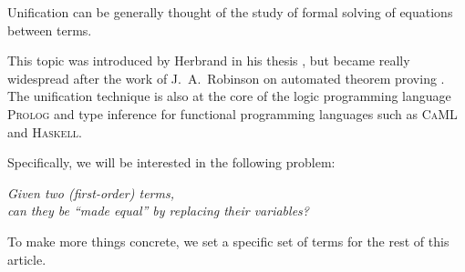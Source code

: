 Unification can be generally thought of the study of formal solving of equations between terms.

This topic was introduced by Herbrand in his thesis \cite{herbrand_recherches_1930}, but became really widespread after the work of J.~A.~Robinson on automated theorem proving \cite{robinson_machine-oriented_1965}. The unification technique is also at the core of the logic programming language \textsc{Prolog} and type inference for functional programming languages such as \textsc{CaML} and \textsc{Haskell}.


Specifically, we will be interested in the following problem: 
\begin{center}
	\it Given two (first-order) terms,\\ can they be “made equal” by replacing their variables?
\end{center}

To make more things concrete, we set a specific set of terms for the rest of this article.





